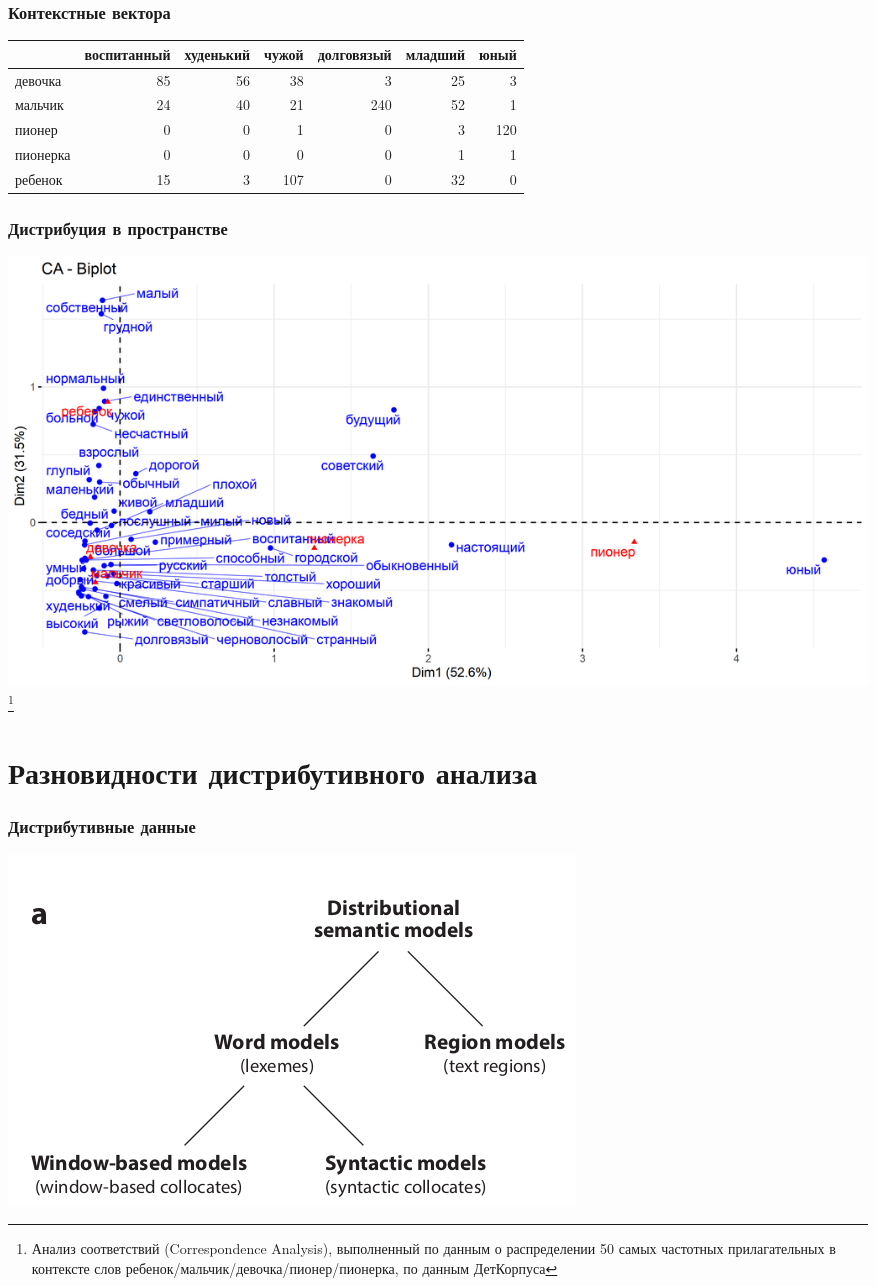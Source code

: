 \documentclass[10pt,svgnames]{beamer}
\begin{document}
\begin{frame}
  \frametitle{Контекстные вектора}
  \footnotesize
  \begin{tabular}[t]{lrrrrrr}
\toprule
  & воспитанный & худенький & чужой & долговязый & младший & юный\\
\midrule
девочка & 85 & 56 & 38 & 3 & 25 & 3\\
мальчик & 24 & 40 & 21 & 240 & 52 & 1\\
пионер & 0 & 0 & 1 & 0 & 3 & 120\\
пионерка & 0 & 0 & 0 & 0 & 1 & 1\\
ребенок & 15 & 3 & 107 & 0 & 32 & 0\\
\bottomrule
\end{tabular}
\end{frame}

\begin{frame}
  \frametitle{Дистрибуция в пространстве}
  \includegraphics[width=\textwidth]{deti.png}\footnote{Анализ
    соответствий (Correspondence Analysis), выполненный по данным о
    распределении 50 самых частотных прилагательных в контексте слов
    ребенок/мальчик/девочка/пионер/пионерка, по данным ДетКорпуса}
\end{frame}

\section{Разновидности дистрибутивного анализа}

\begin{frame}
  \frametitle{Дистрибутивные данные}
  \includegraphics[width=\textwidth]{dsm-types}
\end{frame}
\end{document}
